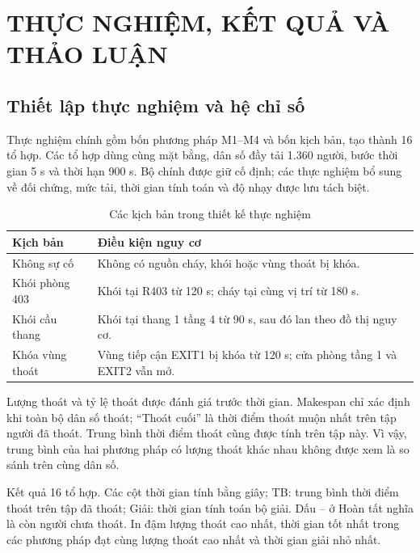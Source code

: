 \clearpage\section{THỰC NGHIỆM, KẾT QUẢ VÀ THẢO LUẬN}
\subsection{Thiết lập thực nghiệm và hệ chỉ số}
Thực nghiệm chính gồm bốn phương pháp M1--M4 và bốn kịch bản, tạo thành 16 tổ hợp. Các tổ hợp dùng cùng mặt bằng, dân số đầy tải 1.360 người, bước thời gian 5 s và thời hạn 900 s. Bộ chính được giữ cố định; các thực nghiệm bổ sung về đối chứng, mức tải, thời gian tính toán và độ nhạy được lưu tách biệt.

\begin{table}[htbp]\centering\caption{Các kịch bản trong thiết kế thực nghiệm}
\small\begin{tabularx}{\linewidth}{P{2.8cm}X}\toprule
Kịch bản & Điều kiện nguy cơ\\\midrule
Không sự cố & Không có nguồn cháy, khói hoặc vùng thoát bị khóa.\\
Khói phòng 403 & Khói tại R403 từ 120 s; cháy tại cùng vị trí từ 180 s.\\
Khói cầu thang & Khói tại thang 1 tầng 4 từ 90 s, sau đó lan theo đồ thị nguy cơ.\\
Khóa vùng thoát & Vùng tiếp cận EXIT1 bị khóa từ 120 s; cửa phòng tầng 1 và EXIT2 vẫn mở.\\\bottomrule
\end{tabularx}\end{table}

Lượng thoát và tỷ lệ thoát được đánh giá trước thời gian. Makespan chỉ xác định khi toàn bộ dân số thoát; ``Thoát cuối'' là thời điểm thoát muộn nhất trên tập người đã thoát. Trung bình thời điểm thoát cũng được tính trên tập này. Vì vậy, trung bình của hai phương pháp có lượng thoát khác nhau không được xem là so sánh trên cùng dân số.

\begin{table}[htbp]\centering
\caption[Kết quả 16 tổ hợp phương pháp--kịch bản]{Kết quả 16 tổ hợp. Các cột thời gian tính bằng giây; TB: trung bình thời điểm thoát trên tập đã thoát; Giải: thời gian tính toán bộ giải. Dấu -- ở Hoàn tất nghĩa là còn người chưa thoát. In đậm lượng thoát cao nhất, thời gian tốt nhất trong các phương pháp đạt cùng lượng thoát cao nhất và thời gian giải nhỏ nhất.}
\label{tab:allresults}\end{table}

